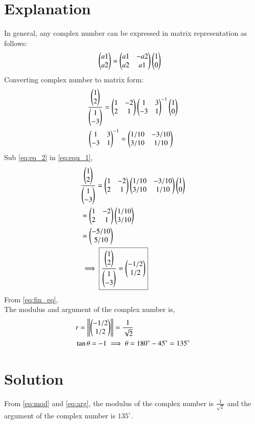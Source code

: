 \documentclass[journal,12pt,twocolumn]{IEEEtran}
\begin{document}
\section{Explanation}
In general, any complex number can be expressed in matrix representation as follows:
\begin{align}  \label{eq:gen_1}
& \begin{pmatrix}a1\\ a2\end{pmatrix} = \begin{pmatrix}a1 & -a2\\ a2 & a1\end{pmatrix}\begin{pmatrix}1\\ 0\end{pmatrix}
\end{align}
Converting complex number to matrix form:
\begin{align}  
& \frac{\begin{pmatrix}1\\ 2\end{pmatrix}}{\begin{pmatrix}1\\ -3\end{pmatrix}} = \begin{pmatrix}1 & -2\\ 2 &1\end{pmatrix}\begin{pmatrix}1 & 3\\ -3 &1\end{pmatrix}^{-1}\begin{pmatrix}1\\ 0\end{pmatrix}\label{eq:equ_1}\\
&\begin{pmatrix}1 & 3\\ -3 &1\end{pmatrix}^{-1} = \begin{pmatrix}1/10 & -3/10\\ 3/10 &1/10\end{pmatrix}\label{eq:eq_2}
\end{align}
Sub \eqref{eq:eq_2} in \eqref{eq:equ_1},
\begin{align}  
& \frac{\begin{pmatrix}1\\ 2\end{pmatrix}}{\begin{pmatrix}1\\ -3\end{pmatrix}} = \begin{pmatrix}1 & -2\\ 2 &1\end{pmatrix}\begin{pmatrix}1/10 & -3/10\\ 3/10 &1/10\end{pmatrix}\begin{pmatrix}1\\ 0\end{pmatrix}\label{eq:eq_3}\\
& = \begin{pmatrix}1 & -2\\ 2 &1\end{pmatrix}\begin{pmatrix}1/10\\ 3/10\end{pmatrix}\\
& = \begin{pmatrix}-5/10\\ 5/10\end{pmatrix}\\
& \implies \boxed{\frac{\begin{pmatrix}1\\ 2\end{pmatrix}}{\begin{pmatrix}1\\ -3\end{pmatrix}} = \begin{pmatrix}-1/2\\ 1/2\end{pmatrix}} \label{eq:fin_eq}
\end{align}
From \eqref{eq:fin_eq},\\
The modulus and argument of the complex number is,\\
\begin{align}
& r = \left\lVert\begin{pmatrix}-1/2\\ 1/2\end{pmatrix}\right\rVert = \frac{1}{\sqrt{2}}\label{eq:mod}\\
& \tan\theta = -1 \implies \theta = 180^{\circ}-45^{\circ} = 135^{\circ} \label{eq:arg}
\end{align}


\section{Solution}

From \eqref{eq:mod} and \eqref{eq:arg}, the modulus of the complex number is $\frac{1}{\sqrt{2}}$ and the argument of the complex number is $135^{\circ}$.

\\
\end{document}
